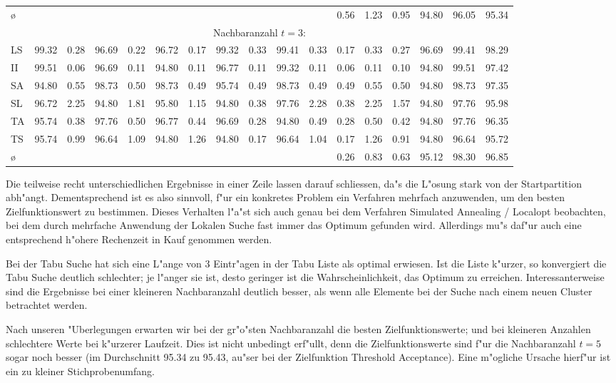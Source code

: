{\begin{tabular}{l||rr|rr|rr|rr|rr||ccc||ccc}
\hline
\multicolumn{1}{l}{{\o}} & \multicolumn{10}{c}{\quad} & 0.56&1.23&\multicolumn{1}{c}{0.95} & 94.80&96.05&95.34\\
\multicolumn{17}{c}{{\normalsize Nachbaranzahl $t=3$:}\rule[-2mm]{0mm}{8mm}}\\
\hline
LS&99.32&0.28&96.69&0.22&96.72&0.17&99.32&0.33&99.41&0.33&0.17&0.33&0.27&96.69&99.41&98.29\\ 
II&99.51&0.06&96.69&0.11&94.80&0.11&96.77&0.11&99.32&0.11&0.06&0.11&0.10&94.80&99.51&97.42\\
SA&94.80&0.55&98.73&0.50&98.73&0.49&95.74&0.49&98.73&0.49&0.49&0.55&0.50&94.80&98.73&97.35\\
SL&96.72&2.25&94.80&1.81&95.80&1.15&94.80&0.38&97.76&2.28&0.38&2.25&1.57&94.80&97.76&95.98\\
TA&95.74&0.38&97.76&0.50&96.77&0.44&96.69&0.28&94.80&0.49&0.28&0.50&0.42&94.80&97.76&96.35\\
TS&95.74&0.99&96.64&1.09&94.80&1.26&94.80&0.17&96.64&1.04&0.17&1.26&0.91&94.80&96.64&95.72\\
\hline
\multicolumn{1}{l}{{\o}} & \multicolumn{10}{c}{\quad} & 0.26&0.83&\multicolumn{1}{c}{0.63} & 95.12&98.30&96.85
\end{tabular}
}

\vspace{3mm}

Die teilweise recht unterschiedlichen Ergebnisse in einer Zeile lassen 
darauf schliessen, da"s die L"osung stark von der Startpartition abh"angt.
Dementsprechend ist es also sinnvoll, f"ur ein konkretes Problem ein
Verfahren mehrfach anzuwenden, um den besten Zielfunktionswert zu bestimmen.
Dieses Verhalten l"a"st sich auch genau bei dem Verfahren Simulated Annealing /
Localopt beobachten, bei dem durch mehrfache Anwendung der Lokalen
Suche fast immer das Optimum gefunden wird. Allerdings mu"s daf"ur auch
eine entsprechend h"ohere Rechenzeit in Kauf genommen werden.

Bei der Tabu Suche hat sich eine
L"ange von 3 Eintr"agen in der Tabu Liste als optimal 
erwiesen. Ist die Liste k"urzer, so konvergiert die Tabu Suche
deutlich schlechter; je l"anger sie ist, desto geringer ist die
Wahrscheinlichkeit, das Optimum zu erreichen.
Interessanterweise sind die Ergebnisse bei einer kleineren Nachbaranzahl
deutlich besser, als wenn alle Elemente bei der Suche nach einem neuen
Cluster betrachtet werden.

Nach unseren "Uberlegungen erwarten wir bei der gr"o"sten Nachbaranzahl die 
besten Zielfunktionswerte; und bei kleineren Anzahlen schlechtere
Werte bei k"urzerer Laufzeit. Dies ist nicht unbedingt
erf"ullt, denn die Zielfunktionswerte sind f"ur die Nachbaranzahl $t=5$ sogar
noch besser (im Durchschnitt 95.34 zu 95.43, au"ser bei der Zielfunktion
Threshold Acceptance). 
Eine m"ogliche Ursache hierf"ur ist ein zu kleiner Stichprobenumfang.

